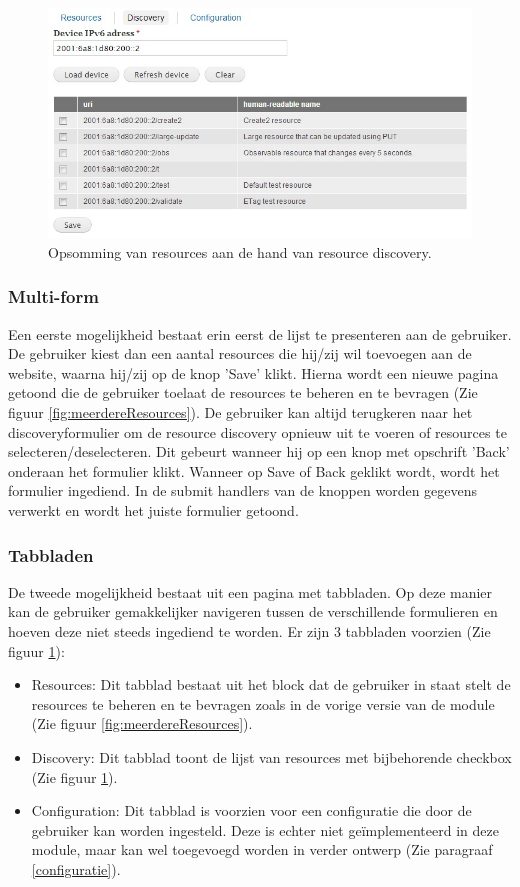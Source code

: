 \begin{figure}[h!]
\centering
\includegraphics[width=1\textwidth]{fig/tabbladen}
\caption{Opsomming van resources aan de hand van resource discovery.}
\label{fig:tabbladen}
\end{figure}

\subsubsection{Multi-form}
Een eerste mogelijkheid bestaat erin eerst de lijst te presenteren aan de gebruiker. De gebruiker kiest dan een aantal resources die hij/zij wil toevoegen aan de website, waarna hij/zij op de knop 'Save' klikt. Hierna wordt een nieuwe pagina getoond die de gebruiker toelaat de resources te beheren en te bevragen (Zie figuur \ref{fig:meerdereResources}). De gebruiker kan altijd terugkeren naar het discoveryformulier om de resource discovery opnieuw uit te voeren of resources te selecteren/deselecteren. Dit gebeurt wanneer hij op een knop met opschrift 'Back' onderaan het formulier klikt. Wanneer op Save of Back geklikt wordt, wordt het formulier ingediend. In de submit handlers van de knoppen worden gegevens verwerkt en wordt het juiste formulier getoond.

\subsubsection{Tabbladen}
De tweede mogelijkheid bestaat uit een pagina met tabbladen. Op deze manier kan de gebruiker gemakkelijker navigeren tussen de verschillende formulieren en hoeven deze niet steeds ingediend te worden. Er zijn 3 tabbladen voorzien (Zie figuur \ref{fig:tabbladen}):
\begin{itemize}
\item Resources: Dit tabblad bestaat uit het block dat de gebruiker in staat stelt de resources te beheren en te bevragen zoals in de vorige versie van de module (Zie figuur \ref{fig:meerdereResources}).
\item Discovery: Dit tabblad toont de lijst van resources met bijbehorende checkbox (Zie figuur \ref{fig:tabbladen}).
\item Configuration: Dit tabblad is voorzien voor een configuratie die door de gebruiker kan worden ingesteld. Deze is echter niet ge\"{i}mplementeerd in deze module, maar kan wel toegevoegd worden in verder ontwerp (Zie paragraaf \ref{configuratie}).
\end{itemize}

